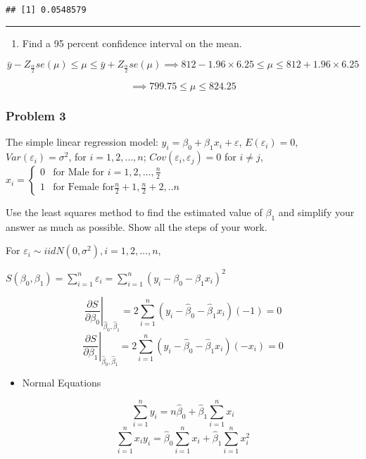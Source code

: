 \documentclass[]{article}
\providecommand{\tightlist}{%
  \setlength{\itemsep}{0pt}\setlength{\parskip}{0pt}}
\begin{document}
\begin{verbatim}
## [1] 0.0548579
\end{verbatim}

\begin{center}\rule{0.5\linewidth}{\linethickness}\end{center}

\begin{enumerate}
\def\labelenumi{(\alph{enumi})}
\setcounter{enumi}{3}
\tightlist
\item
  Find a 95 percent confidence interval on the mean.
\end{enumerate}

\[\bar y-Z_{\frac{α}2}se(\mu)\le\mu\le\bar y+Z_{\frac{α}2}se(\mu)\implies 812-1.96\times6.25\le\mu\le812+1.96\times6.25\]

\[\implies 799.75\le\mu\le824.25\]

\hypertarget{problem-3}{%
\subsubsection{Problem 3}\label{problem-3}}

The simple linear regression model: \(y_i=β_0+β_1 x_i+ε\), \(E(ε_i)=0\),
\(Var(ε_i)=\sigma^2\), for \(i=1,2,…,n\); \(Cov(ε_i,ε_j)=0\) for
\(i≠j\),
\(x_i=\begin{cases}0& \text{for Male for }i=1,2,…,\frac{n}2\\1& \text{for Female for}\frac{n}2+1,\frac{n}2+2,..n\end{cases}\)

Use the least squares method to find the estimated value of \(β_1\) and
simplify your answer as much as possible. Show all the steps of your
work.

For \(ε_i\sim iid N(0, \sigma^2), i=1,2,…,n\),

\(S(\beta_0,\beta_1)=\sum_{i=1}^n\varepsilon_i=\sum_{i=1}^n(y_i-\beta_0-\beta_1x_i)^2\)

\[\left.\frac{\partial S}{\partial\beta_0}\right|_{\hat\beta_0,\hat\beta_1}=2\sum_{i=1}^n(y_i-\hat\beta_0-\hat\beta_1x_i)(-1)=0\]
\[\left.\frac{\partial S}{\partial\beta_1}\right|_{\hat\beta_0,\hat\beta_1}=2\sum_{i=1}^n(y_i-\hat\beta_0-\hat\beta_1x_i)(-x_i)=0\]

\begin{itemize}
\tightlist
\item
  Normal Equations
\end{itemize}

\[\sum_{i=1}^ny_i=n\hat\beta_0+\hat\beta_1\sum_{i=1}^nx_i\]
\[\sum_{i=1}^nx_iy_i=\hat\beta_0\sum_{i=1}^nx_i+\hat\beta_1\sum_{i=1}^nx_i^2\]
\end{document}
